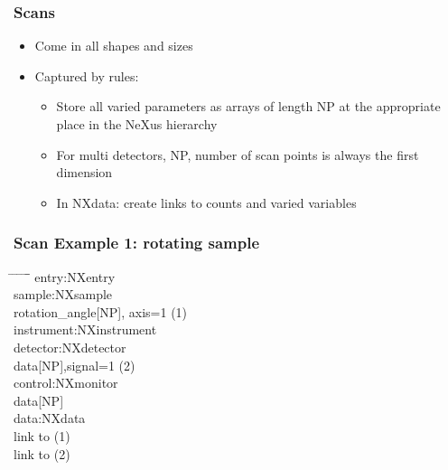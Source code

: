 \documentclass{beamer}
\begin{document}
\begin{frame}
\frametitle{Scans}
\begin{itemize}
\item Come in all shapes and sizes
\item Captured by rules:
\begin{itemize}
\item Store all varied parameters as arrays of length NP at the appropriate place in the NeXus 
 hierarchy
\item For multi detectors, NP, number of scan points is always the first dimension
\item In NXdata: create links to counts and varied variables
\end{itemize}
\end{itemize}
\end{frame}


\begin{frame}
\frametitle{Scan Example 1: rotating sample}

\begin{tabbing}
\hspace*{1cm} \= \hspace*{1cm} \= \hspace*{1cm} \= \hspace*{1cm} \= \hspace*{1cm} \= \hspace*{1cm}\= \kill
entry:NXentry \\
 \>sample:NXsample\\
 \> \> rotation\_angle[NP], axis=1 (1) \\
 \> instrument:NXinstrument\\
 \>  \>detector:NXdetector\\
 \>  \> \>data[NP],signal=1 (2)\\
 \>control:NXmonitor\\  
 \> \>data[NP]\\  
 \>data:NXdata\\
 \> \> link to (1)\\
 \> \> link to (2) \\
\end{tabbing}
\end{frame}
\end{document}
